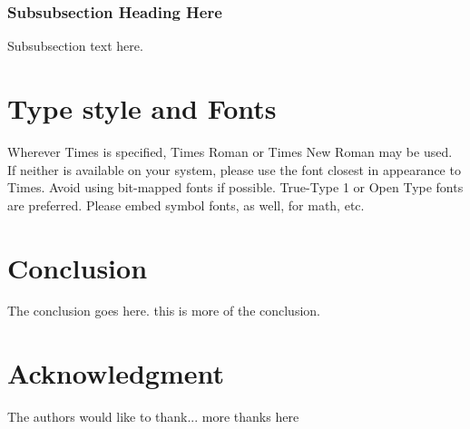 \documentclass[10pt, conference, compsocconf,a4paper]{IEEEtran}
\begin{document}
\subsubsection{Subsubsection Heading Here}
Subsubsection text here.

\section{Type style and Fonts}
Wherever Times is specified, Times Roman or Times New Roman may be used. If neither is available on your system, please use the font closest in appearance to Times. Avoid using bit-mapped fonts if possible. True-Type 1 or Open Type fonts are preferred. Please embed symbol fonts, as well, for math, etc.

\section{Conclusion}
The conclusion goes here. this is more of the conclusion.


\section*{Acknowledgment}

The authors would like to thank...
more thanks here




\end{document}
